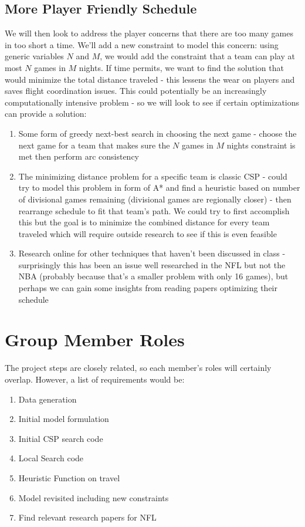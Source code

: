 \documentclass{article}
\begin{document}
	\subsection{More Player Friendly Schedule}
	We will then look to address the player concerns that there are too many games in too short a time. We'll add a new constraint to model this concern: using generic variables $N$ and $M$, we would add the constraint that a team can play at most $N$ games in $M$ nights.  If time permits, we want to find the solution that would minimize the total distance traveled - this lessens the wear on players and saves flight coordination issues. This could potentially be an increasingly computationally intensive problem - so we will look to see if certain optimizations can provide a solution:

	\begin{enumerate}
		\item Some form of greedy next-best search in choosing the next game - choose the next game for a team that makes sure the $N$ games in $M$ nights constraint is met then perform arc consistency
		\item The minimizing distance problem for a specific team is classic CSP - could try to model this problem in form of A* and find a heuristic based on number of divisional games remaining (divisional games are regionally closer) - then rearrange schedule to fit that team's path. We could try to first accomplish this but the goal is to minimize the combined distance for every team traveled which will require outside research to see if this is even feasible
		\item Research online for other techniques that haven't been discussed in class - surprisingly this has been an issue well researched in the NFL but not the NBA (probably because that's a smaller problem with only 16 games), but perhaps we can gain some insights from reading papers optimizing their schedule
	\end{enumerate}

	\section{Group Member Roles}
	The project steps are closely related, so each member's roles will certainly overlap. However, a list of requirements would be:

	\begin{enumerate}
		\item Data generation
		\item Initial model formulation
		\item Initial CSP search code
		\item Local Search code
		\item Heuristic Function on travel
		\item Model revisited including new constraints
		\item Find relevant research papers for NFL
	\end{enumerate}
\end{document}
